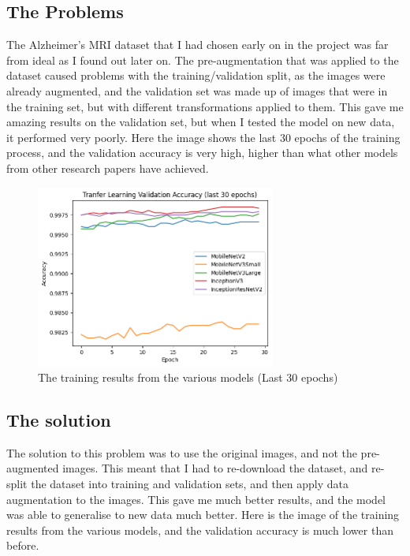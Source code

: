 \documentclass[]{final_report}
\begin{document}
\subsection{The Problems}

The Alzheimer's MRI dataset that I had chosen early on in the project was far from ideal as I found out later on.
The pre-augmentation that was applied to the dataset caused problems with the training/validation split, as the
images were already augmented, and the validation set was made up of images that were in the training set, but
with different transformations applied to them. This gave me amazing results on the validation set, but when I
tested the model on new data, it performed very poorly. Here the image shows the last 30 epochs of the training process,
and the validation accuracy is very high, higher than what other models from other research papers have achieved.

\begin{figure}[h]
  \centering
  \includegraphics[width=0.7\textwidth]{images/bad-training-result.png}
  \caption{The training results from the various models (Last 30 epochs)}
  \label{fig:training_results}
\end{figure}

\pagebreak

\subsection{The solution}
The solution to this problem was to use the original images, and not the pre-augmented images.
This meant that I had to re-download the dataset, and re-split the dataset into training and validation sets,
and then apply data augmentation to the images. This gave me much better results, and the model was able to generalise
to new data much better. Here is the image of the training results from the various models, and the validation accuracy is much lower than before.
\end{document}
